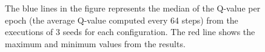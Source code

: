\begin{figure}[t]
	\centering
	 \quad
	 \\
	 \quad
	 \\
	
	\caption{The blue lines in the figure represents the median of the Q-value  per epoch (the average Q-value computed every 64 steps) from the executions of 3 seeds for each configuration. The red line shows the maximum and minimum values from the results.}
	\label{fig:q-values}
\end{figure}


